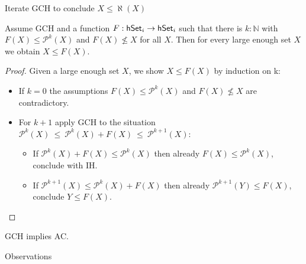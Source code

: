 \documentclass[xcolor=dvipsnames,compress,aspectratio=169,handout]{beamer}
\newcommand{\MBB}[1]{\ensuremath{\mathbb{#1}}\xspace}  %
\newcommand{\MCL}[1]{\ensuremath{\mathcal{#1}}\xspace} %
\newcommand{\Nat}{\MBB{N}}   %
\newcommand{\Pow}{\MCL P}
\begin{document}
\begin{frame}{Iterate GCH to conclude $X\le \aleph(X)$}

	\pause
	\begin{theorem}
		Assume GCH and a function $F:\mathsf{hSet}_i\to\mathsf{hSet}_i$ such that there is $k:\Nat$ with $F(X)\le \Pow^k(X)$ and $F(X)\not\le X$ for all $X$.
		Then for every large enough set $X$ we obtain $X\le F(X)$.
	\end{theorem}
	\vspace{-0.1cm}
	\pause
	\begin{proof}
		\pause
		Given a large enough set $X$, we show $X\le F(X)$ by induction on k:
		\begin{itemize}
			\vspace{0.2cm}
			\pause
			\item
			If $k=0$ the assumptions $F(X)\le \Pow^k(X)$ and $F(X)\not\le X$ are contradictory.
			\vspace{0.2cm}
			\pause
			\item
			For $k+1$ apply GCH to the situation $\Pow^{k}(X)~\le~ \Pow^{k}(X)+F(X)~\le~ \Pow^{k+1}(X)$:
			\begin{itemize}
			\vspace{0.2cm}
			\pause
			\item
			If $\Pow^{k}(X)+F(X)\le \Pow^{k}(X)$ then already $F(X)\le \Pow^{k}(X)$, conclude with IH.
			\vspace{0.2cm}
			\item
			\pause
			If $\Pow^{k+1}(X)\le \Pow^{k}(X)+F(X)$ then already $\Pow^{k+1}(Y)\le F(X)$, conclude $Y\le F(X)$.
			\qedhere
			\end{itemize}
		\end{itemize}
	\end{proof}
	\pause
	\vspace{-0.1cm}
	\begin{corollary}
		GCH implies AC.
	\end{corollary}
\end{frame}

\begin{frame}
	\Huge
	\centering
	Observations
\end{frame}
\end{document}

